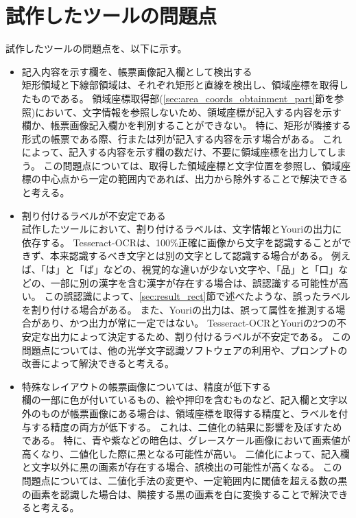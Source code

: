 \section{試作したツールの問題点}\label{sec:problems}
試作したツールの問題点を、以下に示す。

\begin{itemize}
    \item 記入内容を示す欄を、帳票画像記入欄として検出する\\
        矩形領域と下線部領域は、それぞれ矩形と直線を検出し、領域座標を取得したものである。
        領域座標取得部(\ref{sec:area_coords_obtainment_part}節を参照)において、文字情報を参照しないため、領域座標が記入する内容を示す欄か、帳票画像記入欄かを判別することができない。
        特に、矩形が隣接する形式の帳票である際、行または列が記入する内容を示す場合がある。
        これによって、記入する内容を示す欄の数だけ、不要に領域座標を出力してしまう。
        この問題点については、取得した領域座標と文字位置を参照し、領域座標の中心点から一定の範囲内であれば、出力から除外することで解決できると考える。
    \item 割り付けるラベルが不安定である\\
        試作したツールにおいて、割り付けるラベルは、文字情報とYouriの出力に依存する。
        Tesseract-OCRは、100\%正確に画像から文字を認識することができず、本来認識するべき文字とは別の文字として認識する場合がある。
        例えば、「は」と「ば」などの、視覚的な違いが少ない文字や、「品」と「口」などの、一部に別の漢字を含む漢字が存在する場合は、誤認識する可能性が高い。
        この誤認識によって、\ref{sec:result_rect}節で述べたような、誤ったラベルを割り付ける場合がある。
        また、Youriの出力は、誤って属性を推測する場合があり、かつ出力が常に一定ではない。
        Tesseract-OCRとYouriの2つの不安定な出力によって決定するため、割り付けるラベルが不安定である。
        この問題点については、他の光学文字認識ソフトウェアの利用や、プロンプトの改善によって解決できると考える。
    \item 特殊なレイアウトの帳票画像については、精度が低下する\\
        欄の一部に色が付いているもの、絵や押印を含むものなど、記入欄と文字以外のものが帳票画像にある場合は、領域座標を取得する精度と、ラベルを付与する精度の両方が低下する。
        これは、二値化の結果に影響を及ぼすためである。
        特に、青や紫などの暗色は、グレースケール画像において画素値が高くなり、二値化した際に黒となる可能性が高い。
        二値化によって、記入欄と文字以外に黒の画素が存在する場合、誤検出の可能性が高くなる。
        この問題点については、二値化手法の変更や、一定範囲内に閾値を超える数の黒の画素を認識した場合は、隣接する黒の画素を白に変換することで解決できると考える。

\end{itemize}
